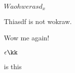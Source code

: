 \begin{assertion}[id=hello, type=lemma]
  $ Waohwer asd_x $
\end{assertion}

\begin{axiom}[id=newAx]
 Thiasdf is not wokraw.
\end{axiom}

\begin{symboldec}[name=zero, title=Not working]
Wow me again!
\end{symboldec}

\begin{definition}[id=kk.def]
$ \epsilon \kk $
\end{definition}

\begin{definition}[id=test.one]
  is this
\end{definition}

\begin{definition}
\end{definition}